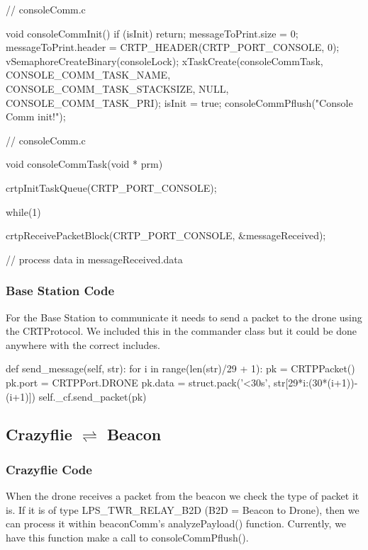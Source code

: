 \documentclass[]{article}
\begin{document}
\begin{C}
// consoleComm.c

void consoleCommInit() {
	if (isInit) return;
	messageToPrint.size = 0;
	messageToPrint.header = CRTP_HEADER(CRTP_PORT_CONSOLE, 0);
	vSemaphoreCreateBinary(consoleLock);
	xTaskCreate(consoleCommTask, CONSOLE_COMM_TASK_NAME,
	CONSOLE_COMM_TASK_STACKSIZE, NULL, CONSOLE_COMM_TASK_PRI);
	isInit = true;
	consoleCommPflush("Console Comm init!");
}
\end{C}

\newpage
\begin{C}
// consoleComm.c

void consoleCommTask(void * prm) {
	crtpInitTaskQueue(CRTP_PORT_CONSOLE);
	
	while(1) {
		crtpReceivePacketBlock(CRTP_PORT_CONSOLE, &messageReceived);
		
		// process data in messageReceived.data
	}
}
\end{C}

\subsubsection{Base Station Code}

\noindent For the Base Station to communicate it needs to send a packet to the drone using the CRTProtocol. We included this in the commander class but it could be done anywhere with the correct includes.

\begin{Python}
def send_message(self, str):
	for i in range(len(str)/29 + 1):
		pk = CRTPPacket()
		pk.port = CRTPPort.DRONE
		pk.data = struct.pack('<30s', str[29*i:(30*(i+1))-(i+1)])
		self._cf.send_packet(pk)
\end{Python}

\subsection{\texorpdfstring{Crazyflie $\rightleftharpoons$ Beacon}%
	{Between Crazyflie and Beacon}}

\subsubsection{Crazyflie Code}

When the drone receives a packet from the beacon we check the type of packet it is. If it is of type LPS\_TWR\_RELAY\_B2D (B2D = Beacon to Drone), then we can process it within beaconComm's analyzePayload() function. Currently, we have this function make a call to consoleCommPflush().
\end{document}
